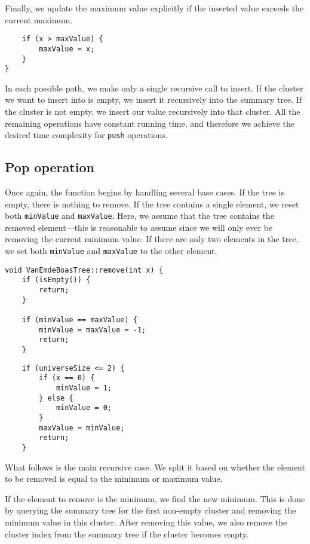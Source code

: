 Finally, we update the maximum value explicitly if the inserted value exceeds the current maximum.

\begin{verbatim}
    if (x > maxValue) {
        maxValue = x;
    }
}
\end{verbatim}

In each possible path, we make only a single recursive call to insert. If the cluster we want to insert into is empty, we insert it recursively into the summary tree. If the cluster is not empty, we insert our value recursively into that cluster. All the remaining operations have constant running time, and therefore we achieve the desired time complexity for \texttt{push} operations.

\subsection{Pop operation}

Once again, the function begins by handling several base cases. If the tree is empty, there is nothing to remove. If the tree contains a single element, we reset both \texttt{minValue} and \texttt{maxValue}. Here, we assume that the tree contains the removed element—this is reasonable to assume since we will only ever be removing the current minimum value. If there are only two elements in the tree, we set both \texttt{minValue} and \texttt{maxValue} to the other element.

\begin{verbatim}
void VanEmdeBoasTree::remove(int x) {
    if (isEmpty()) {
        return;
    }

    if (minValue == maxValue) {
        minValue = maxValue = -1;
        return;
    }
\end{verbatim}

\begin{verbatim}
    if (universeSize <= 2) {
        if (x == 0) {
            minValue = 1;
        } else {
            minValue = 0;
        }
        maxValue = minValue;
        return;
    }
\end{verbatim}

What follows is the main recursive case. We split it based on whether the element to be removed is equal to the minimum or maximum value.

If the element to remove is the minimum, we find the new minimum. This is done by querying the summary tree for the first non-empty cluster and removing the minimum value in this cluster. After removing this value, we also remove the cluster index from the summary tree if the cluster becomes empty.

